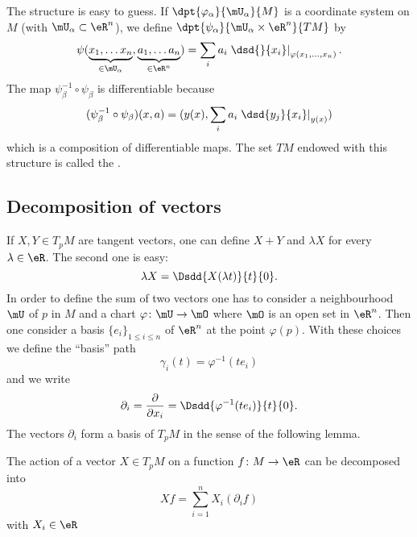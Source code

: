 The structure is easy to guess. If $\dpt{\varphi_{\alpha}}{\mU_{\alpha}}{M}$ is a coordinate system on $M$ (with $\mU_{\alpha}\subset\eR^n$), we define $\dpt{\psi_{\alpha}}{\mU_{\alpha}\times \eR^n}{TM}$ by
\[
  \psi( \underbrace{x_1,\ldots x_n}_{\in\mU_{\alpha}},\underbrace{a_1,\ldots a_n}_{\in\eR^n}  )
          =\sum_i a_i\left.\dsd{}{x_i}\right|_{\varphi(x_1,\ldots,x_n)}.
\]
The map $\psi_{\beta}^{-1}\circ\psi_{\beta}$ is differentiable because
\[
(\psi_{\beta}^{-1}\circ\psi_{\beta})(x,a)=( y(x),\sum_i a_i\left.\dsd{y_j}{x_i}\right|_{y(x)}  )
\]
which is a composition of differentiable maps. The set $TM$ endowed with this structure is called the .


\subsection{Decomposition of vectors}

If \( X,Y\in T_pM\) are tangent vectors, one can define \( X+Y\) and \( \lambda X\) for every \( \lambda\in\eR\). The second one is easy:
\begin{equation}
    \lambda X=\Dsdd{ X(\lambda t) }{t}{0}.
\end{equation}
In order to define the sum of two vectors one has to consider a neighbourhood \( \mU\) of \( p\) in \( M\) and a chart \( \varphi\colon \mU\to \mO\) where \( \mO\) is an open set in \( \eR^n\). Then one consider a basis \( \{ e_i \}_{1\leq i\leq n}\) of \( \eR^n\) at the point \( \varphi(p)\). With these choices we define the ``basis'' path
\begin{equation}
    \gamma_i(t)=\varphi^{-1}(te_i)
\end{equation}
and we write
\begin{equation}
    \partial_i=\frac{ \partial  }{ \partial x_i }=\Dsdd{ \varphi^{-1}(te_i) }{t}{0}.
\end{equation}
The vectors \( \partial_i\) form a basis of \( T_pM\) in the sense of the following lemma.

\begin{lemma}       \label{LEMooXDESooHXzIJU}
    The action of a vector \( X\in T_pM\) on a function \( f\colon M\to \eR\) can be decomposed into
    \begin{equation}
        Xf=\sum_{i=1}^n X_i(\partial_if)
    \end{equation}
    with \( X_i\in\eR\)
\end{lemma}

